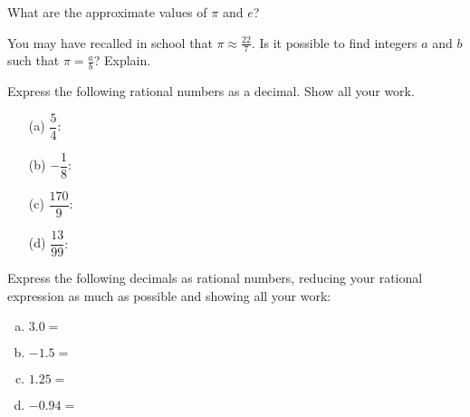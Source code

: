 \documentclass[11pt,letterpaper]{article}
\begin{document}

 What are the approximate values of $\pi$ and $e$?



\vspace{3cm}



 You may have recalled in school that $\pi \approx \frac{22}{7}$. Is it possible to find integers $a$ and $b$ such that $\pi= \frac{a}{b}$? Explain. 



\vspace{4cm}



 Express the following rational numbers as a decimal. Show all your work. \pspace
\begin{minipage}[t]{0.49\textwidth}
\begin{enumerate}
\item[(a)] $\dfrac{5}{4}:$  \vfill
\item[(b)] $-\dfrac{1}{8}:$  \vfill
\end{enumerate}
\end{minipage}
\begin{minipage}[t]{0.49\textwidth}
\begin{enumerate}
\item[(c)] $\dfrac{170}{9}:$  \vfill
\item[(d)] $\dfrac{13}{99}:$  \vfill
\end{enumerate}
\end{minipage}



\newpage



 Express the following decimals as rational numbers, reducing your rational expression as much as possible and showing all your work: \pspace
\begin{enumerate}[(a)]
\item $3.0=$ \pvspace{1cm}
\item $-1.5=$ \pvspace{1cm}
\item $1.25=$ \pvspace{1cm}
\item $-0.94=$ \pvspace{1cm}
\end{enumerate}
\end{document}
